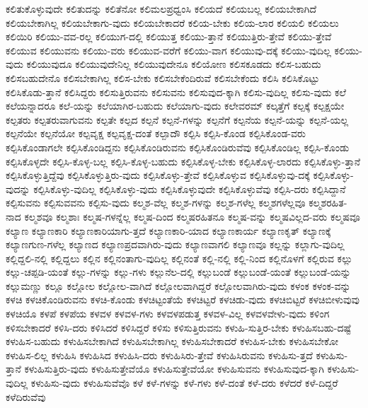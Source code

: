 {ಕಲಿತುಕೊಳ್ಳುವುದೇ
ಕಲಿತುದನ್ನು
ಕಲಿತೆನೋ
ಕಲಿಮಲಪ್ರಧ್ವಂಸಿ
ಕಲಿಯದೆ
ಕಲಿಯಬಲ್ಲ
ಕಲಿಯಬೇಕಾಗಿದೆ
ಕಲಿಯಬೇಕಾಗಿಲ್ಲ
ಕಲಿಯಬೇಕಾಗು-ವುದು
ಕಲಿಯಬೇಕಾದರೆ
ಕಲಿಯ-ಬೇಕು
ಕಲಿಯ-ಲಾರ
ಕಲಿಯಲಿ
ಕಲಿಯಲು
ಕಲಿಯಿರಿ
ಕಲಿಯು-ವವ-ರಲ್ಲ
ಕಲಿಯುಗ-ದಲ್ಲಿ
ಕಲಿಯುತ್ತ
ಕಲಿಯು-ತ್ತಾನೆ
ಕಲಿಯುತ್ತಿರು-ತ್ತೇವೆ
ಕಲಿಯು-ತ್ತೇವೆ
ಕಲಿಯುವ
ಕಲಿಯುವನು
ಕಲಿಯು-ವರು
ಕಲಿಯುವ-ವರೆಗೆ
ಕಲಿಯು-ವಾಗ
ಕಲಿಯುವು-ದಕ್ಕೆ
ಕಲಿಯು-ವುದಿಲ್ಲ
ಕಲಿಯು-ವುದು
ಕಲಿಯುವುದೂ
ಕಲಿಯುವುದೇನಿಲ್ಲ
ಕಲಿಯುವುದೇನೂ
ಕಲಿಯೋಣ
ಕಲಿಸಕೂಡದು
ಕಲಿಸ-ಬಹುದು
ಕಲಿಸಬಹುದೇನೊ
ಕಲಿಸಬೇಕಾಗಿಲ್ಲ
ಕಲಿಸ-ಬೇಕು
ಕಲಿಸಬೇಕೆಂದಿರುವೆ
ಕಲಿಸಬೇಕೆಂದು
ಕಲಿಸಿ
ಕಲಿಸಿಕೊಟ್ಟು
ಕಲಿಸಿಕೊಡು-ತ್ತಾನೆ
ಕಲಿಸಿದ್ದರು
ಕಲಿಸುತ್ತಿರುವನು
ಕಲಿಸುವನು
ಕಲಿಸುವುದ-ಕ್ಕಾಗಿ
ಕಲಿಸು-ವುದಿಲ್ಲ
ಕಲಿಸು-ವುದು
ಕಲೆ
ಕಲೆಯನ್ನಾದರೂ
ಕಲೆ-ಯನ್ನು
ಕಲೆಯಾಗಿರ-ಬಹುದು
ಕಲೆಯಾಗು-ವುದು
ಕಲೇವರಮ್
ಕಲ್ಕತ್ತೆಗೆ
ಕಲ್ಪಕ್ಕೆ
ಕಲ್ಪಕ್ಷಯೇ
ಕಲ್ಪತರು
ಕಲ್ಪತರುವಾಗುವನು
ಕಲ್ಪತೇ
ಕಲ್ಪದ
ಕಲ್ಪನೆ
ಕಲ್ಪನೆ-ಗಳನ್ನು
ಕಲ್ಪನೆಗೆ
ಕಲ್ಪನೆಯ
ಕಲ್ಪನೆ-ಯನ್ನು
ಕಲ್ಪನೆ-ಯಲ್ಲ
ಕಲ್ಪನೆಯೇ
ಕಲ್ಪನೆಯೋ
ಕಲ್ಪವೃಕ್ಷ
ಕಲ್ಪವೃಕ್ಷ-ದಂತೆ
ಕಲ್ಪಾದೌ
ಕಲ್ಪಿಸಿ
ಕಲ್ಪಿಸಿ-ಕೊಂಡ
ಕಲ್ಪಿಸಿಕೊಂಡ-ವರು
ಕಲ್ಪಿಸಿಕೊಂಡಾಗಲೇ
ಕಲ್ಪಿಸಿಕೊಂಡಿದ್ದನು
ಕಲ್ಪಿಸಿಕೊಂಡಿರುವನು
ಕಲ್ಪಿಸಿಕೊಂಡಿರುವೆವು
ಕಲ್ಪಿಸಿಕೊಂಡಿಲ್ಲ
ಕಲ್ಪಿಸಿ-ಕೊಂಡು
ಕಲ್ಪಿಸಿಕೊಳ್ಳದೇ
ಕಲ್ಪಿಸಿ-ಕೊಳ್ಳ-ಬಲ್ಲ
ಕಲ್ಪಿಸಿ-ಕೊಳ್ಳ-ಬಹುದು
ಕಲ್ಪಿಸಿಕೊಳ್ಳ-ಬೇಕು
ಕಲ್ಪಿಸಿಕೊಳ್ಳ-ಲಾರದು
ಕಲ್ಪಿಸಿಕೊಳ್ಳು-ತ್ತಾನೆ
ಕಲ್ಪಿಸಿಕೊಳ್ಳುತ್ತಿದ್ದೆವು
ಕಲ್ಪಿಸಿಕೊಳ್ಳುತ್ತಿರು-ವುದು
ಕಲ್ಪಿಸಿಕೊಳ್ಳು-ತ್ತೇವೆ
ಕಲ್ಪಿಸಿಕೊಳ್ಳುವ
ಕಲ್ಪಿಸಿಕೊಳ್ಳುವು-ದಕ್ಕೆ
ಕಲ್ಪಿಸಿಕೊಳ್ಳು-ವುದನ್ನು
ಕಲ್ಪಿಸಿಕೊಳ್ಳು-ವುದಿಲ್ಲ
ಕಲ್ಪಿಸಿಕೊಳ್ಳು-ವುದು
ಕಲ್ಪಿಸಿಕೊಳ್ಳುವುದೇ
ಕಲ್ಪಿಸಿಕೊಳ್ಳುವೆವು
ಕಲ್ಪಿಸಿ-ದರು
ಕಲ್ಪಿಸಿದ್ದಾನೆ
ಕಲ್ಪಿಸುವನು
ಕಲ್ಪಿಸುವವನು
ಕಲ್ಪಿಸು-ವುದು
ಕಲ್ಮಶ-ವೆಲ್ಲ
ಕಲ್ಮಶ-ಗಳನ್ನು
ಕಲ್ಮಶ-ಗಳೆಲ್ಲ
ಕಲ್ಮಶಗಳೆಲ್ಲವೂ
ಕಲ್ಮಶರಹಿತ-ನಾದ
ಕಲ್ಮಶವೂ
ಕಲ್ಮಶಾಃ
ಕಲ್ಮಷ-ಗಳನ್ನೆಲ್ಲ
ಕಲ್ಮಷ-ದಿಂದ
ಕಲ್ಮಷರಹಿತನೂ
ಕಲ್ಮಷ-ವನ್ನು
ಕಲ್ಮಷವಿಲ್ಲದ-ವರು
ಕಲ್ಮಷವೂ
ಕಲ್ಯಾಣ
ಕಲ್ಯಾಣಕಾರಿ
ಕಲ್ಯಾಣಕಾರಿಯಾಗು-ತ್ತದೆ
ಕಲ್ಯಾಣಕಾರಿ-ಯಾದ
ಕಲ್ಯಾಣಕಾರ್ಯ
ಕಲ್ಯಾಣಕೃತ್
ಕಲ್ಯಾಣಕ್ಕೆ
ಕಲ್ಯಾಣಗುಣ-ಗಳೆಲ್ಲ
ಕಲ್ಯಾಣದ
ಕಲ್ಯಾಣಪ್ರದವಾಗಿರು-ವುದು
ಕಲ್ಯಾಣವಾಗಲಿ
ಕಲ್ಯಾಣವೂ
ಕಲ್ಲನ್ನು
ಕಲ್ಲಾಗು-ವುದಿಲ್ಲ
ಕಲ್ಲಿದ್ದಲಿ-ನಲ್ಲಿ
ಕಲ್ಲಿದ್ದಲು
ಕಲ್ಲಿನ
ಕಲ್ಲಿನಂತಾಗು-ವುದಿಲ್ಲ
ಕಲ್ಲಿನಂತೆ
ಕಲ್ಲಿ-ನಲ್ಲಿ
ಕಲ್ಲಿ-ನಿಂದ
ಕಲ್ಲಿನೊಳಗೆ
ಕಲ್ಲಿರುವ
ಕಲ್ಲು
ಕಲ್ಲು-ಚಪ್ಪಡಿ-ಯಂತೆ
ಕಲ್ಲು-ಗಳನ್ನು
ಕಲ್ಲು-ಗಳು
ಕಲ್ಲುನೆಲ-ದಲ್ಲಿ
ಕಲ್ಲುಬಂಡೆ
ಕಲ್ಲುಬಂಡೆ-ಯಂತೆ
ಕಲ್ಲುಬಂಡೆ-ಯನ್ನು
ಕಲ್ಲುಮಣ್ಣು
ಕಲ್ಲೂ
ಕಲ್ಲೋಲ
ಕಲ್ಲೋಲ-ವಾಗಿದೆ
ಕಲ್ಲೋಲವಾಗಿದ್ದರೆ
ಕಲ್ಲೋಲವಾಗಿರು-ವುದು
ಕಳಂಕ
ಕಳಂಕ-ವನ್ನು
ಕಳಚಿ
ಕಳಚಿಕೊಂಡಿರುವನು
ಕಳಚಿ-ಕೊಂಡು
ಕಳಚಿಟ್ಟಂತೆಯೆ
ಕಳಚಿಟ್ಟರೆ
ಕಳಚಿಡು-ವುದು
ಕಳಚಿಬಿಟ್ಟರೆ
ಕಳಚಿಬೀಳುವುವು
ಕಳಚಿಯೊ
ಕಳಪೆ
ಕಳಪೆಯ
ಕಳವಳ
ಕಳವಳ-ಗಳು
ಕಳವಳಪಡುತ್ತ
ಕಳವಳ-ವಿಲ್ಲ
ಕಳವಳವೇಳು-ವುದು
ಕಳಿಂಗ
ಕಳಿಸಬೇಕಾದರೆ
ಕಳಿಸಿ-ದರು
ಕಳಿಸಿದರೆ
ಕಳಿಸಿದ್ದರೆ
ಕಳಿಸು
ಕಳಿಸುತ್ತಿರುವನು
ಕಳುಹಿ-ಸುತ್ತಿರ-ಬೇಕು
ಕಳುಹಿಸಬಹು-ದಷ್ಟೆ
ಕಳುಹಿಸ-ಬಹುದು
ಕಳುಹಿಸಬೇಕಾಗಿದೆ
ಕಳುಹಿಸಬೇಕಾಗಿಲ್ಲ
ಕಳುಹಿಸಬೇಕಾದರೆ
ಕಳುಹಿಸ-ಬೇಕು
ಕಳುಹಿಸಬೇಕೋ
ಕಳುಹಿಸ-ಲಿಲ್ಲ
ಕಳುಹಿಸಿ
ಕಳುಹಿಸಿದ
ಕಳುಹಿಸಿ-ದರು
ಕಳುಹಿಸಿರು-ತ್ತೇವೆ
ಕಳುಹಿಸಿರುವನು
ಕಳುಹಿಸು-ತ್ತದೆ
ಕಳುಹಿಸು-ತ್ತಾನೆ
ಕಳುಹಿಸುತ್ತಿರು-ವುದು
ಕಳುಹಿಸುತ್ತೇವೆಯೊ
ಕಳುಹಿಸುತ್ತೇವೆಯೋ
ಕಳುಹಿಸುವನು
ಕಳುಹಿಸುವುದ-ಕ್ಕಾಗಿ
ಕಳುಹಿಸು-ವುದಿಲ್ಲ
ಕಳುಹಿಸು-ವುದು
ಕಳುಹಿಸುವೆವೊ
ಕಳೆ
ಕಳೆ-ಗಳನ್ನು
ಕಳೆ-ಗಳು
ಕಳೆ-ದಂತೆ
ಕಳೆ-ದರು
ಕಳೆದರೆ
ಕಳೆ-ದಿದ್ದರೆ
ಕಳೆದಿರುವೆವು
}

